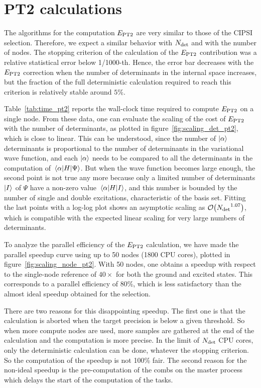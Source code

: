 \documentclass[./thesis.tex]{subfiles}
\begin{document}
\clearpage

\section{PT2 calculations}

The algorithms for the computation $E_\text{PT2}$ are very similar to those of the CIPSI selection. Therefore, we expect a similar behavior with ${N_\text{det}}$ and with the number of nodes.
The stopping criterion of the calculation of the $E_\text{PT2}$ contribution was a
relative statistical error below 1/1000-th. Hence, the error bar decreases with
the $E_\text{PT2}$ correction when the number of determinants in the internal space
increases, but the fraction of the full deterministic calculation required to
reach this criterion is relatively stable around $5$\%.

Table~\ref{tab:time_pt2} reports the wall-clock time required to compute $E_\text{PT2}$
on a single node.
From these data, one can evaluate the scaling of the cost of $E_\text{PT2}$ 
with the number of determinants, as plotted in figure~\ref{fig:scaling_det_pt2},
which is close to linear.
This can be understood, since 
the number of $\ket{\alpha}$ determinants is proportional to the
number of determinants in the variational wave function, and each
$\ket{\alpha}$ needs to be compared to all the determinants 
in the computation of $\mel{\alpha}{H}{\Psi}$.
But when the wave function becomes large enough, the second point is not true any more because only a limited number of determinants $\ket{I}$ of $\Psi$ have a non-zero
value $\mel{\alpha}{H}{I}$, and this number is bounded by the number of single and double excitations, characteristic of the basis set.
Fitting the last points with a log-log plot shows an asymptotic scaling as
$\order{\Ndet^{1.07}}$, which is compatible with the expected linear scaling for
very large numbers of determinants.

To analyze the parallel efficiency of the $E_\text{PT2}$ calculation, we have made the parallel speedup curve using up to 50 nodes (1800 CPU cores), plotted in figure~\ref{fig:scaling_node_pt2}. With 50 nodes, one obtains a speedup with respect to the single-node reference of $40\times$ for both the ground and excited states. This corresponds to a parallel efficiency of 80\%, which is less satisfactory than the almost ideal speedup obtained for the selection.

There are two reasons for this disappointing speedup. The first one is that the calculation is aborted when the target precision is below a given threshold. So when more compute nodes are used, more samples are gathered at the end of the calculation and the computation is more precise. In the limit of ${N_\text{det}}$ CPU cores, only the deterministic calculation can be done, whatever the stopping criterion. So the computation of the speedup is not 100\% fair.
The second reason for the non-ideal speedup is the pre-computation of the combs on the master process which delays the start of the computation of the tasks.
\end{document}
